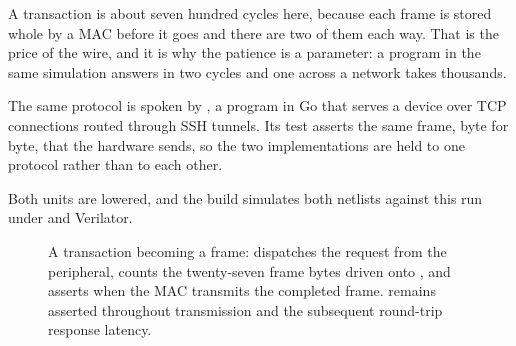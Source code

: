 A transaction is about seven hundred cycles here, because each frame
is stored whole by a MAC before it goes and there are two of them
each way. That is the price of the wire, and it is why the patience
is a parameter: a program in the same simulation answers in two
cycles and one across a network takes thousands.

The same protocol is spoken by , a program in Go
that serves a device over TCP connections routed through SSH tunnels.
Its test asserts the same frame, byte for byte, that the hardware sends,
so the two implementations are held to one protocol rather than to
each other.

Both units are lowered, and the build simulates both netlists against
this run under  and Verilator.

\begin{figure}[htbp]
\centering

\caption{A transaction becoming a frame:  dispatches the
request from the peripheral,  counts the twenty-seven frame
bytes driven onto , and  asserts when the MAC
transmits the completed frame.  remains asserted throughout
transmission and the subsequent round-trip response latency.}
\label{fig:x-remote}
\end{figure}




